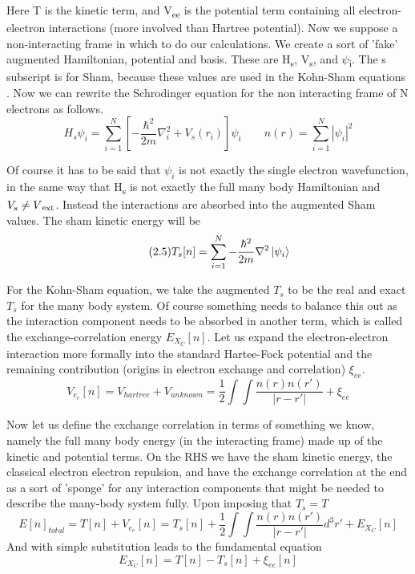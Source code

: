 \documentclass[12pt]{article}
\begin{document}
Here T is the kinetic term, and V\textsubscript{ee} is the potential term containing all electron-electron interactions (more involved than Hartree potential). Now we suppose a non-interacting frame in which to do our calculations. We create a sort of 'fake' augmented Hamiltonian, potential and basis. These are H\textsubscript{s}, V\textsubscript{s}, and $\psi$\textsubscript{i}. The s subscript is for Sham, because these values are used in the Kohn-Sham equations \cite{inhom}. Now we can rewrite the Schrodinger equation for the non interacting frame of N electrons as follows.
\begin{equation} \label{2.4} \tag{2.4}
H_s\psi_i = \sum_{i=1}^{N} [-\frac{\hbar^2}{2m}\nabla_i ^2 + V_s(r_i)] \psi_i \qquad n(r)=\sum_{i=1}^{N} |\psi_i|^2 
\end{equation}

Of course it has to be said that $\psi_i$ is not exactly the single electron wavefunction, in the same way that H\textsubscript{s} is not exactly the full many body Hamiltonian and $V_s \neq V\textsubscript{ext}$. Instead the interactions are absorbed into the augmented Sham values. The sham kinetic energy will be
\begin{equation} \label{2.5} \tag{2.5}
T_s[n]=\sum_{i=1}^{N} -\frac{\hbar^2}{2m}\nabla^2\ket{\psi_i}
\end{equation}

For the Kohn-Sham equation, we take the augmented $T_s$ to be the real and exact $T_s$ for the many body system. Of course something needs to balance this out as the interaction component needs to be absorbed in another term, which is called the exchange-correlation energy $E_X_C[n]$. Let us expand the electron-electron interaction more formally into the standard Hartee-Fock potential and the remaining contribution (origins in electron exchange and correlation) $\xi_{ee}$.
\begin{equation} \label{2.6} \tag{2.6}
V_e_e[n] =V_{hartree}+V_{unknown}=\frac{1}{2}\int \int \frac{n(r)n(r')}{|r-r'|} + \xi_{ee}
\end{equation}


Now let us define the exchange correlation in terms of something we know, namely the full many body energy (in the interacting frame) made up of the kinetic and potential terms. On the RHS we have the sham kinetic energy, the classical electron electron repulsion, and have the exchange correlation at the end as a sort of 'sponge' for any interaction components that might be needed to describe the many-body system fully. Upon imposing that $T_s=T$
\begin{equation} \label{2.6} \tag{2.6}
E[n]_{total}=T[n]+V_e_e[n] = T_s[n] + \frac{1}{2}\int \int \frac{n(r)n(r')}{|r-r'|}d^3 r' + E_X_C[n]
\end{equation}
And with simple substitution leads to the fundamental equation
\begin{equation} \label{2.7} \tag{2.7}
E_X_C[n]=T[n] -T_s[n] + \xi_{ee}[n]
\end{equation}
\end{document}
